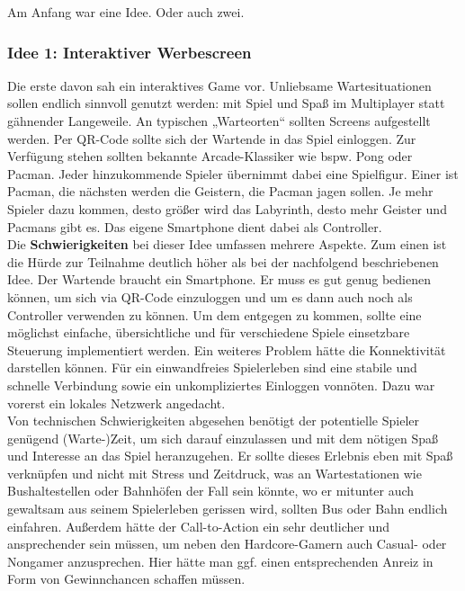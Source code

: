 
Am Anfang war eine Idee. Oder auch zwei.\\

\subsubsection{Idee 1: Interaktiver Werbescreen}

Die erste davon sah ein interaktives Game vor. Unliebsame Wartesituationen sollen endlich sinnvoll genutzt werden: mit Spiel und Spaß im Multiplayer statt gähnender Langeweile. An typischen „Warteorten“ sollten Screens aufgestellt werden. Per QR-Code sollte sich der Wartende in das Spiel einloggen. Zur Verfügung stehen sollten bekannte Arcade-Klassiker wie bspw. Pong oder Pacman. Jeder hinzukommende Spieler übernimmt dabei eine Spielfigur. Einer ist Pacman, die nächsten werden die Geistern, die Pacman jagen sollen. Je mehr Spieler dazu kommen, desto größer wird das Labyrinth, desto mehr Geister und Pacmans gibt es. Das eigene Smartphone dient dabei als Controller.\\

Die \textbf{Schwierigkeiten} bei dieser Idee umfassen mehrere Aspekte. Zum einen ist die Hürde zur Teilnahme deutlich höher als bei der nachfolgend beschriebenen Idee. Der Wartende braucht ein Smartphone. Er muss es gut genug bedienen können, um sich via QR-Code einzuloggen und um es dann auch noch als Controller verwenden zu können. Um dem entgegen zu kommen, sollte eine möglichst einfache, übersichtliche und für verschiedene Spiele einsetzbare Steuerung implementiert werden. Ein weiteres Problem hätte die Konnektivität darstellen können. Für ein einwandfreies Spielerleben sind eine stabile und schnelle Verbindung sowie ein unkompliziertes Einloggen vonnöten. Dazu war vorerst ein lokales Netzwerk angedacht.\\

Von technischen Schwierigkeiten abgesehen benötigt der potentielle Spieler genügend (Warte-)Zeit, um sich darauf einzulassen und mit dem nötigen Spaß und Interesse an das Spiel heranzugehen. Er sollte dieses Erlebnis eben mit Spaß verknüpfen und nicht mit Stress und Zeitdruck, was an Wartestationen wie Bushaltestellen oder Bahnhöfen der Fall sein könnte, wo er mitunter auch gewaltsam aus seinem Spielerleben gerissen wird, sollten Bus oder Bahn endlich einfahren. Außerdem hätte der Call-to-Action ein sehr deutlicher und ansprechender sein müssen, um neben den Hardcore-Gamern auch Casual- oder Nongamer anzusprechen. Hier hätte man ggf. einen entsprechenden Anreiz in Form von Gewinnchancen schaffen müssen.

